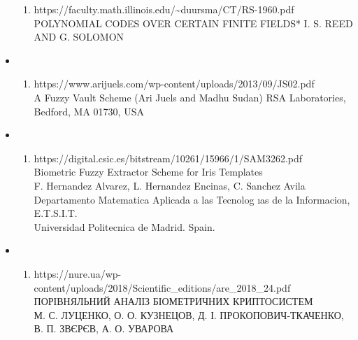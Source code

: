 \documentclass[11pt]{article}
\providecommand{\tightlist}{%
      \setlength{\itemsep}{0pt}\setlength{\parskip}{0pt}}
\begin{document}
\begin{itemize}
\begin{enumerate}
  \tightlist
  \item
    https://faculty.math.illinois.edu/\textasciitilde duursma/CT/RS-1960.pdf\\
    POLYNOMIAL CODES OVER CERTAIN FINITE FIELDS* I. S. REED AND G.
    SOLOMON
  \end{enumerate}
\item
  \begin{enumerate}
  \def\labelenumi{(\arabic{enumi})}
  \setcounter{enumi}{4}
  \tightlist
  \item
    https://www.arijuels.com/wp-content/uploads/2013/09/JS02.pdf\\
    A Fuzzy Vault Scheme (Ari Juels and Madhu Sudan) RSA Laboratories,
    Bedford, MA 01730, USA
  \end{enumerate}
\item
  \begin{enumerate}
  \def\labelenumi{(\arabic{enumi})}
  \setcounter{enumi}{5}
  \tightlist
  \item
    https://digital.csic.es/bitstream/10261/15966/1/SAM3262.pdf\\
    Biometric Fuzzy Extractor Scheme for Iris Templates\\
    F. Hernandez Alvarez, L. Hernandez Encinas, C. Sanchez Avila\\
    Departamento Matematica Aplicada a las Tecnolog ıas de la
    Informacion, E.T.S.I.T.\\
    Universidad Politecnica de Madrid. Spain.
  \end{enumerate}
\item
  \begin{enumerate}
  \def\labelenumi{(\arabic{enumi})}
  \setcounter{enumi}{6}
  \tightlist
  \item
    https://nure.ua/wp-content/uploads/2018/Scientific\_editions/are\_2018\_24.pdf\\
    ПОРІВНЯЛЬНИЙ АНАЛІЗ БІОМЕТРИЧНИХ КРИПТОСИСТЕМ\\
    М. С. ЛУЦЕНКО, О. О. КУЗНЕЦОВ, Д. І. ПРОКОПОВИЧ-ТКАЧЕНКО, В. П.
    ЗВЄРЄВ, А. О. УВАРОВА
  \end{enumerate}
\end{itemize}


    
    
    
\end{document}

